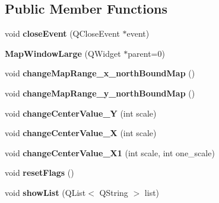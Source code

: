 \subsection*{Public Member Functions}
\begin{DoxyCompactItemize}
\item 
void {\bfseries close\+Event} (Q\+Close\+Event $\ast$event)\hypertarget{class_map_window_large_a15f2cdc1a39af49e9af97c5b684e9af1}{}\label{class_map_window_large_a15f2cdc1a39af49e9af97c5b684e9af1}

\item 
{\bfseries Map\+Window\+Large} (Q\+Widget $\ast$parent=0)\hypertarget{class_map_window_large_ae0c832f52cc26462d0a6ec3a482cbdfc}{}\label{class_map_window_large_ae0c832f52cc26462d0a6ec3a482cbdfc}

\item 
void {\bfseries change\+Map\+Range\+\_\+x\+\_\+north\+Bound\+Map} ()\hypertarget{class_map_window_large_aeb6b265a01b73b3a7f33f6c4dcb94b8b}{}\label{class_map_window_large_aeb6b265a01b73b3a7f33f6c4dcb94b8b}

\item 
void {\bfseries change\+Map\+Range\+\_\+y\+\_\+north\+Bound\+Map} ()\hypertarget{class_map_window_large_ae489a4f49a552f7fd82a6aeba3218bde}{}\label{class_map_window_large_ae489a4f49a552f7fd82a6aeba3218bde}

\item 
void {\bfseries change\+Center\+Value\+\_\+Y} (int scale)\hypertarget{class_map_window_large_a85c128c865b89fb41d1db5a9f4a74f63}{}\label{class_map_window_large_a85c128c865b89fb41d1db5a9f4a74f63}

\item 
void {\bfseries change\+Center\+Value\+\_\+X} (int scale)\hypertarget{class_map_window_large_a120b9d31d20b3fc4f9f4f8eb43e95ac0}{}\label{class_map_window_large_a120b9d31d20b3fc4f9f4f8eb43e95ac0}

\item 
void {\bfseries change\+Center\+Value\+\_\+\+X1} (int scale, int one\+\_\+scale)\hypertarget{class_map_window_large_a422352f7efb4e50ef4b802b01ec105fb}{}\label{class_map_window_large_a422352f7efb4e50ef4b802b01ec105fb}

\item 
void {\bfseries reset\+Flags} ()\hypertarget{class_map_window_large_a04006552b6c8b4eba9623405cf63cd52}{}\label{class_map_window_large_a04006552b6c8b4eba9623405cf63cd52}

\item 
void {\bfseries show\+List} (Q\+List$<$ Q\+String $>$ list)\hypertarget{class_map_window_large_a3a68b5738fe6a09b20dd0773865de518}{}\label{class_map_window_large_a3a68b5738fe6a09b20dd0773865de518}

\end{DoxyCompactItemize}
